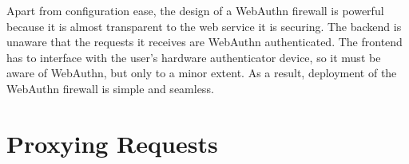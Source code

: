 




Apart from configuration ease, the design of a WebAuthn firewall is powerful because it is almost transparent to the web service it is securing. The backend is unaware that the requests it receives are WebAuthn authenticated. The frontend has to interface with the user's hardware authenticator device, so it must be aware of WebAuthn, but only to a minor extent. As a result, deployment of the WebAuthn firewall is simple and seamless.




\section{Proxying Requests}\label{Sec:ProxyingRequests}

